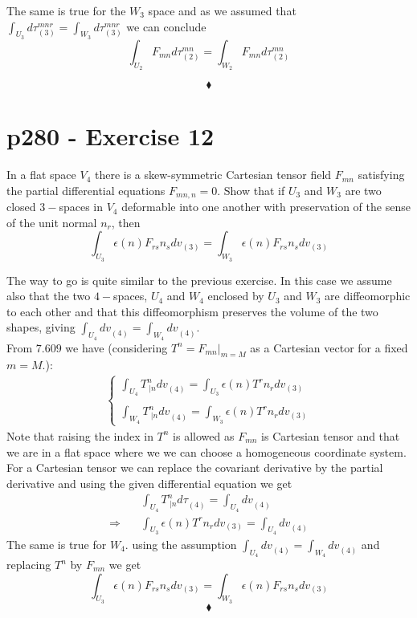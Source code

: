 The same is true for the $W_3$ space and as we assumed that  $\int_{U_3} d\tau_{(3)}^{mnr}=\int_{W_3}d\tau_{(3)}^{mnr}$ we can conclude 
$$\int_{U_2} F_{mn}d\tau_{(2)}^{mn}=\int_{W_2} F_{mn}d\tau_{(2)}^{mn}$$

$$\blacklozenge$$
\newpage


\section{p280 - Exercise 12}
\begin{tcolorbox}
In a flat space $V_4$ there is a skew-symmetric Cartesian tensor field $F_{mn}$ satisfying the partial differential equations $F_{mn,n}=0$. Show that if $U_3$ and $W_3$ are two closed $3-$spaces in $V_4$ deformable into one another with preservation of the sense of the unit normal $n_r$, then 
$$ \int_{U_3} \epsilon (n)F_{rs}n_sdv_{(3)} = \int_{W_3} \epsilon (n)F_{rs}n_sdv_{(3)}$$
\end{tcolorbox}
The way to go is quite similar to the previous exercise. In this case we assume also that the two $4-$spaces, $U_4$ and $W_4$ enclosed by $U_3$ and $W_3$ are diffeomorphic to each other and that this diffeomorphism preserves the volume of the two shapes, giving $\int_{U_4} dv_{(4)}^{}=\int_{W_4}dv_{(4)}^{}$. \\
From $\mathbf{7.609}$ we have (considering $T^n = \left.F_{mn}\right|_{m=M}$ as a Cartesian vector for a fixed $m=M$.): 
\begin{align}
\left\{\begin{array}{l}
\int_{U_4} T^n_{\ |n}dv_{(4)}^{} = \int_{U_3} \epsilon (n)T^rn_rdv_{(3)} \\\\
\int_{W_4} T^n_{\ |n}dv_{(4)}^{} = \int_{W_3} \epsilon (n)T^rn_rdv_{(3)} 
\end{array}\right.
\end{align}
Note that raising the index in $T^n$ is allowed as $F_{mn}$ is Cartesian tensor and that we are in a flat space where we we can choose a homogeneous coordinate system. For a Cartesian tensor we can replace the covariant derivative by the partial derivative and using the given differential equation we get
\begin{align}
&\int_{U_4} T^n_{\ |n}d\tau_{(4)}^{} =\int_{U_4} dv_{(4)}^{}\\
\Rightarrow \quad &\int_{U_3} \epsilon (n)T^r n_rdv_{(3)}  = \int_{U_4} dv_{(4)}^{}
\end{align}
The same is true for $W_4$. using the assumption $\int_{U_4} dv_{(4)}^{}=\int_{W_4}dv_{(4)}^{}$ and replacing $T^n$ by $F_{mn}$ we get $$ \int_{U_3} \epsilon (n)F_{rs}n_sdv_{(3)} = \int_{W_3} \epsilon (n)F_{rs}n_sdv_{(3)}$$
$$\blacklozenge$$
\newpage


